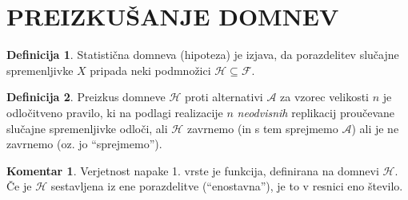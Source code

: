 \documentclass[11pt]{article}
\newcommand{\1}{\mathbbm{1}}
\newcommand{\F}{\mathcal{F}}
\newcommand{\h}{\mathcal{H}}
\newcommand{\A}{\mathcal{A}}
\theoremstyle{definition}
\newtheorem{definicija}{Definicija}[section]
\theoremstyle{definition}
\theoremstyle{definition}
\newtheorem*{komentar}{Komentar}
\begin{document}
\pagebreak


\section{PREIZKUŠANJE DOMNEV}
\vspace{0.5cm}

\begin{definicija}

Statistična domneva (hipoteza) je izjava, da porazdelitev slučajne spremenljivke $X$ pripada neki podmnožici $\h \subseteq \F$.

\end{definicija}
\vspace{0.5cm}

\begin{definicija}

Preizkus domneve $\h$ proti alternativi $\A$ za vzorec velikosti $n$ je odločitveno pravilo, ki na podlagi realizacije $n$ \textit{neodvisnih} replikacij proučevane slučajne spremenljivke odloči, ali $\h$ zavrnemo (in s tem sprejmemo $\A$) ali je ne zavrnemo (oz. jo ``sprejmemo'').

\end{definicija}
\vspace{0.5cm}

\begin{komentar}

Verjetnost napake 1. vrste je funkcija, definirana na domnevi $\h$. Če je $\h$ sestavljena iz ene porazdelitve (``enostavna''), je to v resnici eno število.

\end{komentar}
\vspace{0.5cm}

\end{document}
